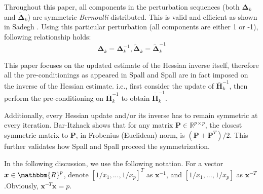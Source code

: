 \documentclass[conference]{IEEEtran}
\newcommand{\bDelta}{\bm{\Delta}}
\newcommand{\oH}{\bm{\overline{H}}}
\newcommand{\ooH}{\bm{\overline{\overline{H}}}}
\newcommand{\tDelta}{\bm{\tilde{\Delta}}}
\begin{document}
Throughout this paper, all components in the perturbation sequences (both $ \bDelta_k $ and $ \tDelta_k $) are symmetric \textit{Bernoulli} distributed. This is valid and efficient as shown in Sadegh \cite{Sadegh1998}. Using this particular perturbation (all components are either 1 or -1), following relationship holds:
\begin{equation} \label{eq:symmetry}
\bDelta_k=\bDelta_k^{-1}, \tDelta_k=\tDelta_k^{-1}
\end{equation}

This paper focuses on the updated estimate of the Hessian inverse itself, therefore all the pre-conditionings as appeared in Spall \cite{Spall2000} and Spall \cite{Spall2009} are in fact imposed on the inverse of the Hessian estimate. i.e., first consider the update of $ \oH_k^{-1} $, then perform the pre-conditioning on $ \oH_k^{-1} $ to obtain $ \ooH_k^{-1} $.

Additionally, every Hessian update and/or its inverse has to remain symmetric at every iteration. Bar-Itzhack \cite{Bar-Itzhack1998} shows that for any matrix $ \bm{P}\in\mathbb{R}^{p\times p} $, the closest symmetric matrix to $ \bm{P} $, in Frobenius (Euclidean) norm, is $ (\bm{P}+\bm{P}^T)/2 $. This further validates how Spall \cite{Spall2000} and Spall \cite{Spall2009} proceed the symmetrization.

In the following discussion, we use the following notation. For a vector $ \bm{x}\in \mathbbm{R}^p $, denote $ [1/x_1, ..., 1/x_p]^T $ as $ \bm{x}^{-1} $, and $ [1/x_1, ..., 1/x_p] $ as $ \bm{x}^{-T} $.Obviously, $ \bm{x}^{-T}\bm{x}=p $.
\end{document}
